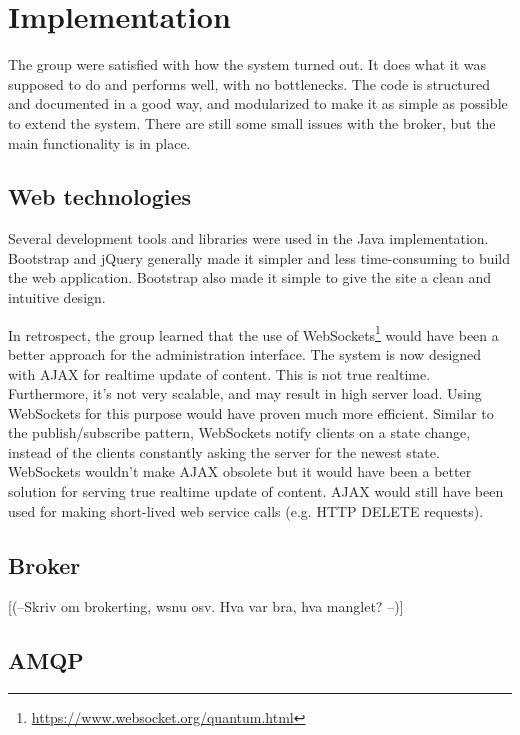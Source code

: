 \section{Implementation}
\label{sec:Implementation}

The group were satisfied with how the system turned out. It does what it was supposed to do and performs well, with no bottlenecks. The code is structured and documented in a good way, and modularized to make it as simple as possible to extend the system. There are still some small issues with the broker, but the main functionality is in place. 

\subsection{Web technologies}
\label{subsec:Web_technologies}

Several development tools and libraries were used in the Java implementation. Bootstrap and jQuery generally made it simpler and less time-consuming to build the web application. Bootstrap also made it simple to give the site a clean and intuitive design. 

In retrospect, the group learned that the use of WebSockets\footnote{\url{https://www.websocket.org/quantum.html}} would have been a better approach for the administration interface. The system is now designed with AJAX for realtime update of content. This is not true realtime. Furthermore, it's not very scalable, and may result in high server load. Using WebSockets for this purpose would have proven much more efficient. Similar to the publish/subscribe pattern, WebSockets notify clients on a state change, instead of the clients constantly asking the server for the newest state. WebSockets wouldn't make AJAX obsolete but it would have been a better solution for serving true realtime update of content. AJAX would still have been used for making short-lived web service calls (e.g. HTTP DELETE requests). \\


\subsection{Broker}
\label{subsec:Implementation_broker}
[(--Skriv om brokerting, wsnu osv. Hva var bra, hva manglet? --)]

\subsection{AMQP}
\label{subsec:Implementation_AMQP}

